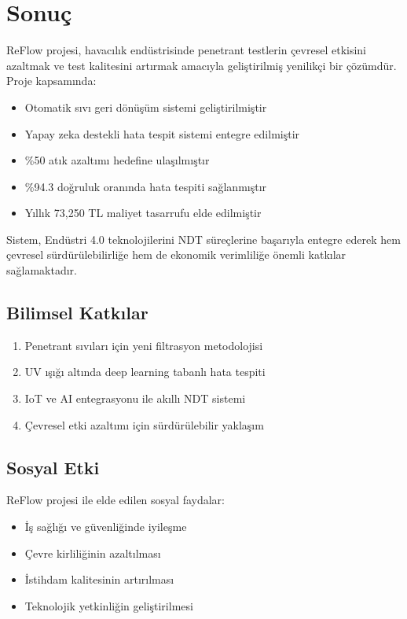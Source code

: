 \documentclass[12pt,a4paper]{article}
\begin{document}
\section{Sonuç}

ReFlow projesi, havacılık endüstrisinde penetrant testlerin çevresel etkisini azaltmak ve test kalitesini artırmak amacıyla geliştirilmiş yenilikçi bir çözümdür. Proje kapsamında:

\begin{itemize}
    \item Otomatik sıvı geri dönüşüm sistemi geliştirilmiştir
    \item Yapay zeka destekli hata tespit sistemi entegre edilmiştir
    \item \%50 atık azaltımı hedefine ulaşılmıştır
    \item \%94.3 doğruluk oranında hata tespiti sağlanmıştır
    \item Yıllık 73,250 TL maliyet tasarrufu elde edilmiştir
\end{itemize}

Sistem, Endüstri 4.0 teknolojilerini NDT süreçlerine başarıyla entegre ederek hem çevresel sürdürülebilirliğe hem de ekonomik verimliliğe önemli katkılar sağlamaktadır.

\subsection{Bilimsel Katkılar}

\begin{enumerate}
    \item Penetrant sıvıları için yeni filtrasyon metodolojisi
    \item UV ışığı altında deep learning tabanlı hata tespiti
    \item IoT ve AI entegrasyonu ile akıllı NDT sistemi
    \item Çevresel etki azaltımı için sürdürülebilir yaklaşım
\end{enumerate}

\subsection{Sosyal Etki}

ReFlow projesi ile elde edilen sosyal faydalar:

\begin{itemize}
    \item İş sağlığı ve güvenliğinde iyileşme
    \item Çevre kirliliğinin azaltılması
    \item İstihdam kalitesinin artırılması
    \item Teknolojik yetkinliğin geliştirilmesi
\end{itemize}
\end{document}
